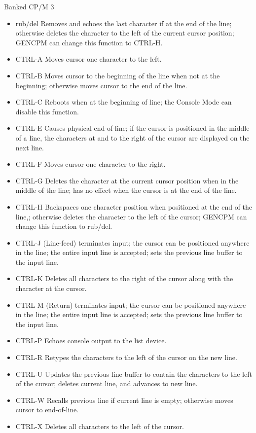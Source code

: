 Banked CP/M 3
\begin{itemize}
\item rub/del Removes and echoes the last character if at the end of
  the line; otherwise deletes the character to the left of the current
  cursor position; GENCPM can change this function to CTRL-H.
\item CTRL-A Moves cursor one character to the left.
\item CTRL-B Moves cursor to the beginning of the line when not at the
  beginning; otherwise moves cursor to the end of the line.
\item CTRL-C Reboots when at the beginning of line; the Console Mode
  can disable this function.
\item CTRL-E Causes physical end-of-line; if the cursor is positioned
  in the middle of a line, the characters at and to the right of the
  cursor are displayed on the next line.
\item CTRL-F Moves cursor one character to the right.
\item CTRL-G Deletes the character at the current cursor position when
  in the middle of the line; has no effect when the cursor is at the
  end of the line.
\item CTRL-H Backspaces one character position when positioned at the
  end of the line,; otherwise deletes the character to the left of the
  cursor; GENCPM can change this function to rub/del.
\item CTRL-J (Line-feed) terminates input; the cursor can be
  positioned anywhere in the line; the entire input line is
  accepted; sets the previous line buffer to the input line.
\item CTRL-K Deletes all characters to the right of the cursor along
  with the character at the cursor.
\item CTRL-M (Return) terminates input; the cursor can be positioned
  anywhere in the line; the entire input line is accepted; sets the
  previous line buffer to the input line.
\item CTRL-P Echoes console output to the list device.
\item CTRL-R Retypes the characters to the left of the cursor on the
  new line.
\item CTRL-U Updates the previous line buffer to contain the
  characters to the left of the cursor; deletes current line, and
  advances to new line.
\item CTRL-W Recalls previous line if current line is empty; otherwise
  moves cursor to end-of-line.
\item CTRL-X Deletes all characters to the left of the cursor.
\end{itemize}

